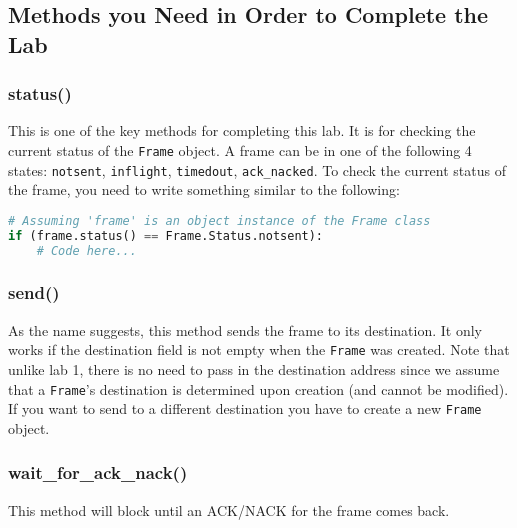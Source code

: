 \documentclass[11pt]{article}
\begin{document}
\subsection{Methods you Need in Order to Complete the Lab}

\subsubsection{status()}
This is one of the key methods for completing this lab. It is for checking the current status of the \texttt{Frame} object. A frame can be in one of the following 4 states: \texttt{notsent}, \texttt{inflight}, \texttt{timedout}, \texttt{ack\_nacked}. To check the current status of the frame, you need to write something similar to the following:
\begin{lstlisting}[caption={Frame status}, language=python]
# Assuming 'frame' is an object instance of the Frame class
if (frame.status() == Frame.Status.notsent):
    # Code here...
\end{lstlisting}

\subsubsection{send()}
As the name suggests, this method sends the frame to its destination. It only works if the destination field is not empty when the \texttt{Frame} was created. Note that unlike lab 1, there is no need to pass in the destination address since we assume that a \texttt{Frame}'s destination is determined upon creation (and cannot be modified). If you want to send to a different destination you have to create a new \texttt{Frame} object.

\subsubsection{wait\_for\_ack\_nack()}
This method will block until an ACK/NACK for the frame comes back.
\end{document}

